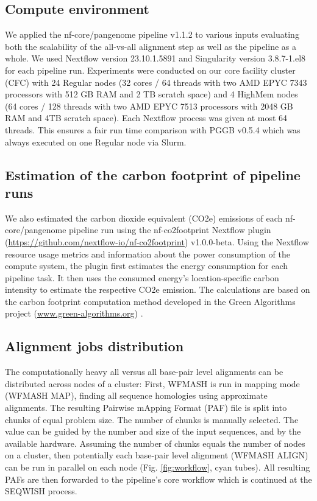 \documentclass{bioinfo}
\theoremstyle{definition}
\begin{document}
	\subsection{Compute environment}
	
	We applied the nf-core/pangenome pipeline v1.1.2 to various inputs evaluating both the scalability of the all-vs-all alignment step as well as the pipeline as a whole. 
	We used Nextflow version 23.10.1.5891 and Singularity version 3.8.7-1.el8 for each pipeline run. 
	Experiments were conducted on our core facility cluster (CFC) with 24 Regular nodes (32 cores / 64 threads with two AMD EPYC 7343 processors with 512 GB RAM and 2 TB scratch space) and 4 HighMem nodes (64 cores / 128 threads with two AMD EPYC 7513 processors with 2048 GB RAM and 4TB scratch space). 
	Each Nextflow process was given at most 64 threads. This ensures a fair run time comparison with PGGB v0.5.4 which was always executed on one Regular node via Slurm.
	
	\subsection{Estimation of the carbon footprint of pipeline runs}
	
	We also estimated the carbon dioxide equivalent (CO2e) emissions of each nf-core/pangenome pipeline run using the nf-co2footprint Nextflow plugin (\href{https://github.com/nextflow-io/nf-co2footprint}{https://github.com/nextflow-io/nf-co2footprint}) v1.0.0-beta. 
	Using the Nextflow resource usage metrics and information about the power consumption of the compute system, the plugin first estimates the energy consumption for each pipeline task. 
	It then uses the consumed energy's location-specific carbon intensity to estimate the respective CO2e emission.
	The calculations are based on the carbon footprint computation method developed in the Green Algorithms project (\href{www.green-algorithms.org}{www.green-algorithms.org}) \citep{Lannelongue2021}.
	
	\subsection{Alignment jobs distribution}
	\label{aln_jobs_dist}

	The computationally heavy all versus all base-pair level alignments can be distributed across nodes of a cluster: 
	First, WFMASH is run in mapping mode (WFMASH MAP), finding all sequence homologies using approximate alignments. 
	The resulting Pairwise mApping Format (PAF) file is split into chunks of equal problem size. 
	The number of chunks is manually selected. 
	The value can be guided by the number and size of the input sequences, and by the available hardware. 
	Assuming the number of chunks equals the number of nodes on a cluster, then potentially each base-pair level alignment (WFMASH ALIGN) can be run in parallel on each node  (Fig. \ref{fig:workflow}, cyan tubes). 
	All resulting PAFs are then forwarded to the pipeline’s core workflow which is continued at the SEQWISH process.
	
\end{document}
